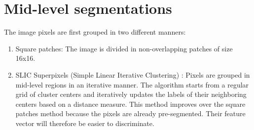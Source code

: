 \documentclass[10pt,conference,compsocconf]{IEEEtran}
\begin{document}
\section{Mid-level segmentations}
\label{sec:orgheadline8}
The image pixels are first grouped in two different manners:
\begin{enumerate}
\item Square patches: The image is divided in non-overlapping patches of size 16x16.
\item SLIC Superpixels (Simple Linear Iterative Clustering) \cite{achanta12}: Pixels are grouped in mid-level regions in an iterative manner. The algorithm starts from a regular grid of cluster centers and iteratively updates the labels of their neighboring centers based on a distance measure. This method improves over the square patches method because the pixels are already pre-segmented. Their feature vector will therefore be easier to discriminate.
\end{enumerate}
\end{document}
